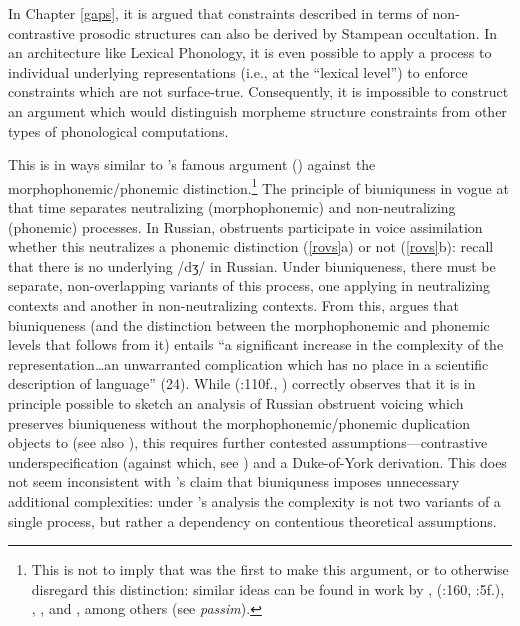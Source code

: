 In Chapter \ref{gaps}, it is argued that constraints described in terms of non-contrastive prosodic structures can also be derived by Stampean occultation.
In an architecture like Lexical Phonology, it is even possible to apply a process to individual underlying representations (i.e., at the ``lexical level'') to enforce constraints which are not surface-true.
Consequently, it is impossible to construct an argument which would distinguish morpheme structure constraints from other types of phonological computations.

This is in ways similar to \citeauthor{SPR}'s famous argument (\citeyear{SPR}) against the morphophonemic/phonemic distinction.\footnote{
    This is not to imply that \citeauthor{SPR} was the first to make this argument, or to otherwise disregard this distinction: similar ideas can be found in work by \citet{Bloch1941}, \citeauthor{Bloomfield1926} (\citeyear{Bloomfield1926}:160, \citeyear{Bloomfield1962}:5f.), \citet{Chao1934}, \citet[244f.]{Hamp1953}, and \citet[47f.]{Sapir1930a}, among others (see \citealt{Anderson1985} \emph{passim}).}
The principle of biuniquness in vogue at that time separates neutralizing (morphophonemic) and non-neutralizing (phonemic) processes.
In Russian, obstruents participate in voice assimilation whether this neutralizes a phonemic distinction (\ref{rovs}a) or not (\ref{rovs}b): recall that there is no underlying /dʒ/ in Russian.
Under biuniqueness, there must be separate, non-overlapping variants of this process, one applying in neutralizing contexts and another in non-neutralizing contexts.
From this, \citeauthor{SPR} argues that biuniqueness (and the distinction between the morphophonemic and phonemic levels that follows from it) entails ``a significant increase in the complexity of the representation\ldots{}an unwarranted complication which has no place in a scientific description of language'' (24).
While \citeauthor{Anderson1985} (\citeyear{Anderson1985}:110f., \citeyear{Anderson2000}) correctly observes that it is in principle possible to sketch an analysis of Russian obstruent voicing which preserves biuniqueness without the morphophonemic/phonemic duplication \citeauthor{SPR} objects to (see also \citealt{Kiparsky1985}), this requires further contested assumptions---contrastive underspecification (against which, see \citealt{Steriade1995}) and a Duke-of-York derivation.
This does not seem inconsistent with \citeauthor{SPR}'s claim that biuniquness imposes unnecessary additional complexities: under \citeauthor{Anderson2000}'s analysis the complexity is not two variants of a single process, but rather a dependency on contentious theoretical assumptions.

